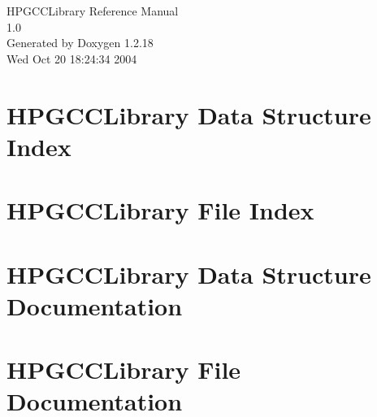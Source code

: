 \documentclass[a4paper]{book}
\begin{document}
\begin{titlepage}
\vspace*{7cm}
\begin{center}
{\Large HPGCCLibrary Reference Manual\\[1ex]\large 1.0}\\
\vspace*{1cm}
{\large Generated by Doxygen 1.2.18}\\
\vspace*{0.5cm}
{\small Wed Oct 20 18:24:34 2004}\\
\end{center}
\end{titlepage}
\clearemptydoublepage
{}
\tableofcontents
\clearemptydoublepage
{}
\chapter{HPGCCLibrary Data Structure Index}

\chapter{HPGCCLibrary File Index}

\chapter{HPGCCLibrary Data Structure Documentation}


\chapter{HPGCCLibrary File Documentation}













\printindex
\end{document}
